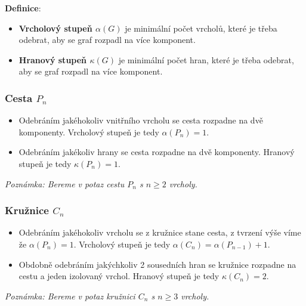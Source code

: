 \documentclass[10pt, a4paper]{ReportSheet}
\begin{document}

    \newpage


    \textbf{Definice}:
    \begin{itemize}
        \item \textbf{Vrcholový stupeň $\alpha(G)$} je minimální počet vrcholů, které je třeba odebrat, aby se graf
        rozpadl na více komponent.
        \item \textbf{Hranový stupeň $\kappa(G)$} je minimální počet hran, které je třeba odebrat, aby se graf rozpadl
        na více komponent.
    \end{itemize}

    \subsubsection{Cesta $P_n$}
    \label{subsubsec:ukol-2-8-cesta}
    \begin{itemize}
        \item Odebráním jakéhokoliv vnitřního vrcholu se cesta rozpadne na dvě komponenty. Vrcholový stupeň je tedy $\alpha(P_n) = 1$.
        \item Odebráním jakékoliv hrany se cesta rozpadne na dvě komponenty. Hranový stupeň je tedy $\kappa(P_n) = 1$.
    \end{itemize}
    \textit{Poznámka: Bereme v potaz cestu $P_n$ s $n \geq 2$ vrcholy.}

    \subsubsection{Kružnice $C_n$}
    \begin{itemize}
        \item Odebráním jakéhokoliv vrcholu se z kružnice stane cesta, z tvrzení výše víme že $\alpha(P_n) = 1$.
        Vrcholový stupeň je tedy $\alpha(C_n) = \alpha(P_{n-1}) + 1$.
        \item Obdobně odebráním jakýchkoliv 2 sousedních hran se kružnice rozpadne na cestu a jeden izolovaný vrchol. Hranový stupeň je tedy $\kappa(C_n) = 2$.
    \end{itemize}
    \textit{Poznámka: Bereme v potaz kružnici $C_n$ s $n \geq 3$ vrcholy.}
\end{document}
